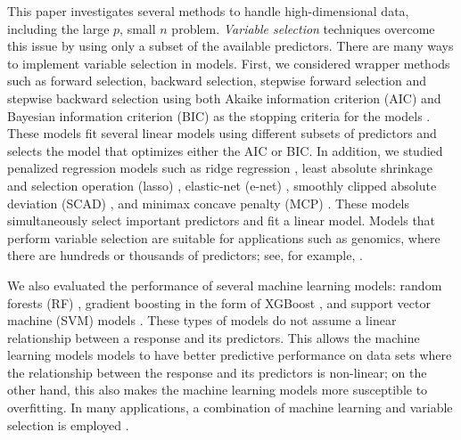 \documentclass[final,onefignum,onetabnum]{siuro210301}
\begin{document}
	
	This paper investigates several methods to handle high-dimensional data, including the large $p$, small $n$ problem. \textit{Variable selection} techniques overcome this issue by using only a subset of the available predictors. There are many ways to implement variable selection in models. First, we considered wrapper methods such as forward selection, backward selection, stepwise forward selection and stepwise backward selection using both Akaike information criterion (AIC) and Bayesian information criterion (BIC) as the stopping criteria for the models \cite{akaike1998information, schwarz1978estimating}. These models fit several linear models using different subsets of predictors and selects the model that optimizes either the AIC or BIC. In addition, we studied penalized regression models such as ridge regression \cite{hoerl1970ridge}, least absolute shrinkage and selection operation (lasso) \cite{tibshirani1996regression}, elastic-net (e-net) \cite{zou2005regularization}, smoothly clipped absolute deviation (SCAD) \cite{fan2001variable}, and minimax concave penalty (MCP) \cite{zhang2010nearly}. These models simultaneously select important predictors and fit a linear model. Models that perform variable selection are suitable for applications such as genomics, where there are hundreds or thousands of predictors; see, for example, \cite{usai2009lasso, li2012overview}.
	
	We also evaluated the performance of several machine learning models: random forests (RF) \cite{breiman2001random}, gradient boosting in the form of XGBoost \cite{chen2021xgboost}, and support vector machine (SVM) models \cite{cortes1995support}. These types of models do not assume a linear relationship between a response and its predictors. This allows the machine learning models models to have better predictive performance on data sets where the relationship between the response and its predictors is non-linear; on the other hand, this also makes the machine learning models more susceptible to overfitting. In many applications, a combination of machine learning and variable selection is employed \cite{wang2018enhanced}.
	
\end{document}
